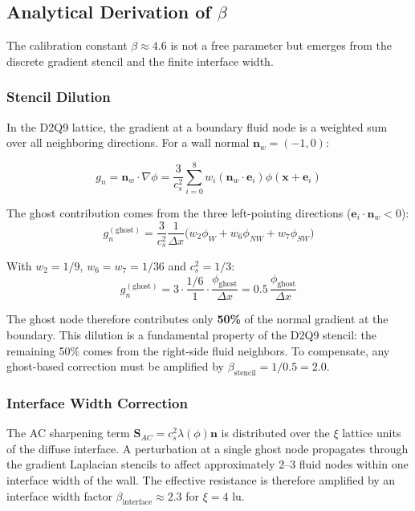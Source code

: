 \subsection{Analytical Derivation of $\beta$}

The calibration constant $\beta \approx 4.6$ is not a free parameter but emerges from the discrete gradient stencil and the finite interface width.

\subsubsection{Stencil Dilution}

In the D2Q9 lattice, the gradient at a boundary fluid node is a weighted sum over all neighboring directions. For a wall normal $\mathbf{n}_w = (-1, 0)$:

\begin{equation}
    g_n = \mathbf{n}_w \cdot \nabla\phi = \frac{3}{c_s^2} \sum_{i=0}^{8} w_i (\mathbf{n}_w \cdot \mathbf{e}_i) \phi(\mathbf{x} + \mathbf{e}_i)
\end{equation}

The ghost contribution comes from the three left-pointing directions ($\mathbf{e}_i \cdot \mathbf{n}_w < 0$):
\begin{equation}
    g_n^{(\text{ghost})} = \frac{3}{c_s^2} \frac{1}{\Delta x} \big(w_2 \phi_W + w_6 \phi_{NW} + w_7 \phi_{SW}\big)
\end{equation}

With $w_2 = 1/9$, $w_6 = w_7 = 1/36$ and $c_s^2 = 1/3$:
\begin{equation}
    g_n^{(\text{ghost})} = 3 \cdot \frac{1/6}{1} \cdot \frac{\phi_{\text{ghost}}}{\Delta x} = 0.5 \, \frac{\phi_{\text{ghost}}}{\Delta x}
\end{equation}

The ghost node therefore contributes only \textbf{50\%} of the normal gradient at the boundary. This dilution is a fundamental property of the D2Q9 stencil: the remaining 50\% comes from the right-side fluid neighbors. To compensate, any ghost-based correction must be amplified by $\beta_{\text{stencil}} = 1/0.5 = 2.0$.

\subsubsection{Interface Width Correction}

The AC sharpening term $\mathbf{S}_{AC} = c_s^2 \lambda(\phi) \mathbf{n}$ is distributed over the $\xi$ lattice units of the diffuse interface. A perturbation at a single ghost node propagates through the gradient Laplacian stencils to affect approximately $2$--$3$ fluid nodes within one interface width of the wall. The effective resistance is therefore amplified by an interface width factor $\beta_{\text{interface}} \approx 2.3$ for $\xi = 4$ lu.

